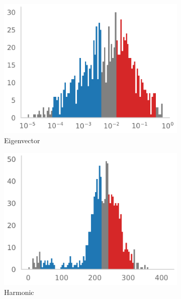 \documentclass[a4paper,11pt]{book}
\theoremstyle{definition}
\begin{document}
\begin{figure}[ht!]
 	\centering
	 \begin{subfigure}[t]{0.32\textwidth}\centering
	\includegraphics[width=\linewidth]{static/paper/eigenvector-centrality-150-partidas-hist}
	\caption{Eigenvector}
	\label{fig:eigenvector-centrality-150-partidas-hist}
	\end{subfigure}
	\begin{subfigure}[t]{0.32\textwidth}\centering
	\includegraphics[width=\linewidth]{static/paper/harmonic-centrality-inverse-weight-150-partidas-hist}
	\caption{Harmonic}
	\label{fig:harmonic-centrality-inverse-weight-150-partidas-hist}
	\end{subfigure}
	\begin{subfigure}[t]{0.32\textwidth}\centering

\end{subfigure}
\end{figure}
\end{document}
